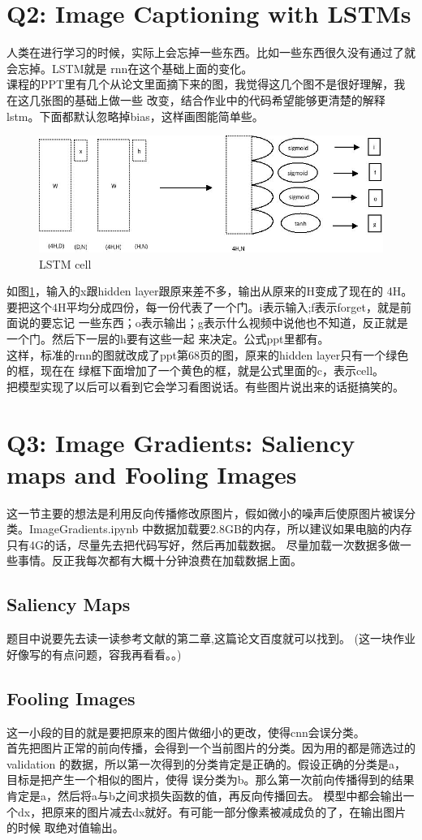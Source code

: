 \documentclass{ctexart}
\begin{document}
\section{Q2: Image Captioning with LSTMs}
人类在进行学习的时候，实际上会忘掉一些东西。比如一些东西很久没有通过了就会忘掉。LSTM就是
rnn在这个基础上面的变化。\\
\indent 课程的PPT里有几个从论文里面摘下来的图，我觉得这几个图不是很好理解，我在这几张图的基础上做一些
改变，结合作业中的代码希望能够更清楚的解释lstm。下面都默认忽略掉bias，这样画图能简单些。\\
\begin{figure}
  \includegraphics[width=5in]{./assignment1_pic/LSTM_cell.jpg}
  \caption{LSTM cell}
  \label{fig:LSTM cell}
\end{figure}
如图\ref{fig:LSTM cell}，输入的x跟hidden layer跟原来差不多，输出从原来的H变成了现在的
4H。要把这个4H平均分成四份，每一份代表了一个门。i表示输入;f表示forget，就是前面说的要忘记
一些东西；o表示输出；g表示什么视频中说他也不知道，反正就是一个门。然后下一层的h要有这些一起
来决定。公式ppt里都有。\\
\indent 这样，标准的rnn的图就改成了ppt第68页的图，原来的hidden layer只有一个绿色的框，现在在
绿框下面增加了一个黄色的框，就是公式里面的c，表示cell。\\
\indent 把模型实现了以后可以看到它会学习看图说话。有些图片说出来的话挺搞笑的。




\section{Q3: Image Gradients: Saliency maps and Fooling Images }
这一节主要的想法是利用反向传播修改原图片，假如微小的噪声后使原图片被误分类。ImageGradients.ipynb
中数据加载要2.8GB的内存，所以建议如果电脑的内存只有4G的话，尽量先去把代码写好，然后再加载数据。
尽量加载一次数据多做一些事情。反正我每次都有大概十分钟浪费在加载数据上面。\\
\subsection{Saliency Maps}
题目中说要先去读一读参考文献的第二章,这篇论文百度就可以找到。
(这一块作业好像写的有点问题，容我再看看。。)

\subsection{Fooling Images}
这一小段的目的就是要把原来的图片做细小的更改，使得cnn会误分类。\\
\indent 首先把图片正常的前向传播，会得到一个当前图片的分类。因为用的都是筛选过的validation
的数据，所以第一次得到的分类肯定是正确的。假设正确的分类是a，目标是把产生一个相似的图片，使得
误分类为b。那么第一次前向传播得到的结果肯定是a，然后将a与b之间求损失函数的值，再反向传播回去。
模型中都会输出一个dx，把原来的图片减去dx就好。有可能一部分像素被减成负的了，在输出图片的时候
取绝对值输出。



\end{document}
